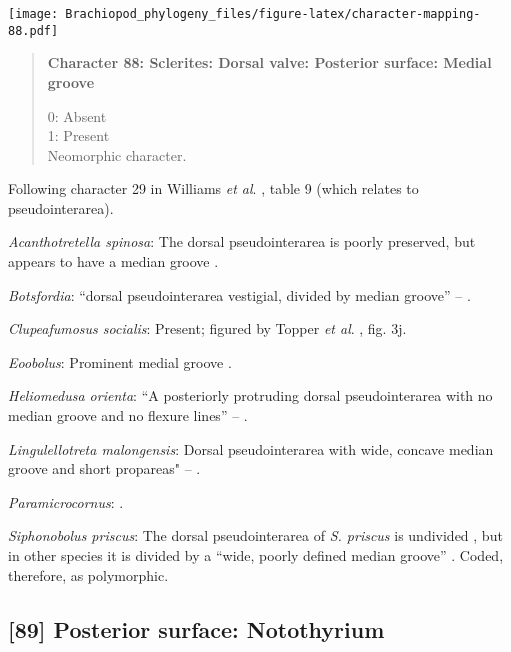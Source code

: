 \documentclass[openany]{book}
\theoremstyle{definition}
\theoremstyle{definition}
\theoremstyle{definition}
\theoremstyle{remark}
\begin{document}
\texttt{[image: Brachiopod\_phylogeny\_files/figure-latex/character-mapping-88.pdf]}

\begin{quote}
\textbf{Character 88: Sclerites: Dorsal valve: Posterior surface: Medial
groove}

0: Absent\\
1: Present\\
Neomorphic character.
\end{quote}

Following character 29 in Williams \emph{et al}.
\citeyearpar{Williams2000LinguliformeaCraniiformea}, table 9 (which
relates to pseudointerarea).

\hypertarget{Acanthotretella_spinosa-coding-88}{}
\emph{Acanthotretella spinosa}: The dorsal pseudointerarea is poorly
preserved, but appears to have a median groove
\citep{Holmer2006Aspinose}.

\hypertarget{Botsfordia-coding-88}{}
\emph{Botsfordia}: ``dorsal pseudointerarea vestigial, divided by median
groove'' -- \citet{Williams2000LinguliformeaCraniiformea}.

\hypertarget{Clupeafumosus_socialis-coding-88}{}
\emph{Clupeafumosus socialis}: Present; figured by Topper \emph{et al}.
\citeyearpar{Topper2013Reappraisalof}, fig. 3j.

\hypertarget{Eoobolus-coding-88}{}
\emph{Eoobolus}: Prominent medial groove
\citep{Balthasar2009Thebrachiopod}.

\hypertarget{Heliomedusa_orienta-coding-88}{}
\emph{Heliomedusa orienta}: ``A posteriorly protruding dorsal
pseudointerarea with no median groove and no flexure lines'' --
\citet{Chen2007Reinterpretationof}.

\hypertarget{Lingulellotreta_malongensis-coding-88}{}
\emph{Lingulellotreta malongensis}: Dorsal pseudointerarea with wide,
concave median groove and short propareas" --
\citet{Williams2000LinguliformeaCraniiformea}.

\hypertarget{Paramicrocornus-coding-88}{}
\emph{Paramicrocornus}: \citet{Zhang2018Ahyolithid}.

\hypertarget{Siphonobolus_priscus-coding-88}{}
\emph{Siphonobolus priscus}: The dorsal pseudointerarea of \emph{S.
priscus} is undivided \citep{Popov2009Earlyontogeny}, but in other
species it is divided by a ``wide, poorly defined median groove''
\citep{Williams2000LinguliformeaCraniiformea}. Coded, therefore, as
polymorphic.

\subsection*{{[}89{]} Posterior surface:
Notothyrium}\label{posterior-surface-notothyrium}
\end{document}

